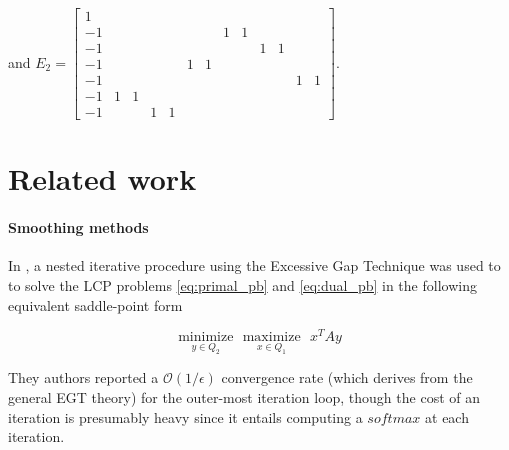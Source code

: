 \documentclass{article} %
\begin{document}
and $E_2 = \left[\begin{array}{ccccccccccccc}
1 &   &   &   &   &   &   &   &   &   &   &   &  \\
-1 &   &   &   &   &   &   & 1 & 1 &   &   &   &  \\
-1 &   &   &   &   &   &   &   &   & 1 & 1 &   &  \\
-1 &   &   &   &   & 1 & 1 &   &   &   &   &   &  \\
-1 &   &   &   &   &   &   &   &   &   &   & 1 & 1\\
-1 & 1 & 1 &   &   &   &   &   &   &   &   &   &  \\
-1 &   &   & 1 & 1 &   &   &   &   &   &   &   &  
\end{array}\right]$.\\



\section{Related work}
\label{sec:related_work}
\paragraph{Smoothing methods}
In \cite{hoda2010smoothing}, a nested iterative procedure using the Excessive Gap Technique \cite{nesterov2005excessive} was used to to solve the LCP problems \eqref{eq:primal_pb} and \eqref{eq:dual_pb} in the following equivalent saddle-point form

\begin{equation}
  \underset{y \in Q_2}{\text{minimize}}\text{ }\underset{x \in Q_1}{\text{maximize}}\text{ }x^TAy
  \label{eq:gilpin}
\end{equation}

They authors reported a $\mathcal{O}(1/\epsilon)$ convergence rate (which derives from the general EGT theory) for the outer-most iteration loop, though the cost of an iteration is presumably heavy since it entails computing a $softmax$ at each iteration.
\end{document}
